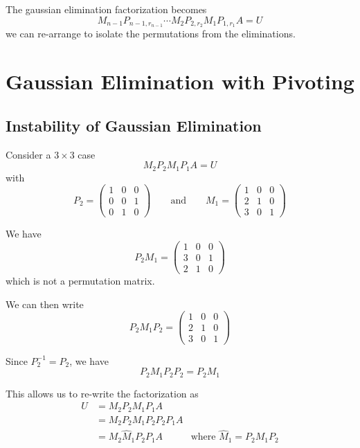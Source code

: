 The gaussian elimination factorization becomes \[
    M_{n-1} P_{n-1, r_{n-1}} \cdots M_2 P_{2, r_2} M_1 P_{1, r_1} A = U
\] we can re-arrange to isolate the permutations from the eliminations.

\section{Gaussian Elimination with Pivoting}

\subsection{Instability of Gaussian Elimination}

\begin{example}
    Consider a \( 3 \times 3 \) case \[
        M_2 P_2 M_1 P_1 A = U
    \] with \[
        P_2 = \begin{pmatrix}
            1 & 0 & 0 \\ 0 & 0 & 1 \\ 0 & 1 & 0
        \end{pmatrix} \qquad \text{and} \qquad
        M_1 = \begin{pmatrix}
            1 & 0 & 0 \\ 2 & 1 & 0 \\ 3 & 0 & 1
        \end{pmatrix}
    \]

    We have \[
        P_2 M_1 = \begin{pmatrix}
            1 & 0 & 0 \\ 3 & 0 & 1 \\ 2 & 1 & 0
        \end{pmatrix}
    \] which is not a permutation matrix.

    We can then write \[
        P_2 M_1 P_2 = \begin{pmatrix}
            1 & 0 & 0 \\ 2 & 1 & 0 \\ 3 & 0 & 1
        \end{pmatrix}
    \]

    Since \( P_2^{-1} = P_2 \), we have \[
        P_2 M_1 P_2 P_2 = P_2 M_1
    \]

    This allows us to re-write the factorization as \begin{align*}
        U & = M_2 P_2 M_1 P_1 A                   \\
          & = M_2 P_2 M_1 P_2 P_2 P_1 A           \\
          & = M_2 \hat{M}_1 P_2 P_1 A
          & \text{where } \hat{M}_1 = P_2 M_1 P_2
    \end{align*}
\end{example}

